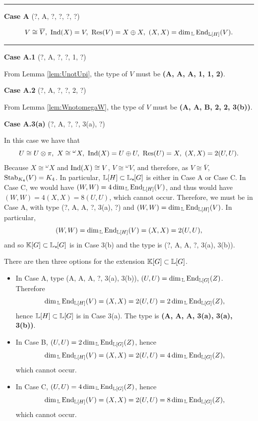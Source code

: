 \vspace{0.5em}
\textcolor{gray}{\hrule}

\vspace{0.9em}
\begin{center}
    \large{\textbf{Case A} (?, A, ?, ?, ?, ?)}
\end{center}
\[
 V \cong \overline{V}, \ \Ind(X) = V, \ \Res(V) = X \oplus X, \ (X,X) = \dim_{\bbL} \End_{\bL[H]}(V).
\]
\vspace{-0.3em}
\textcolor{gray}{\hrule}
\vspace{0.5em}

\vspace{0.5em}
\noindent \textbf{Case A.1} (?, A, ?, ?, 1, ?)

From Lemma \ref{lem:UnotUpi}, the type of $V$ must be \textbf{(A, A, A, 1, 1, 2)}.

\vspace{0.5em}
\noindent \textbf{Case A.2} (?, A, ?, ?, 2, ?)

From Lemma \ref{lem:WnotomegaW}, the type of $V$ must be \textbf{(A, A, B, 2, 2, 3(b))}.

\vspace{0.5em}
\noindent \textbf{Case A.3(a)} (?, A, ?, ?, 3(a), ?)

In this case we have that
\[
U \cong U \otimes \pi, \ X \cong {}^{\omega} X,\ \Ind(X) = U \oplus U, \ \Res(U) = X, \ (X,X) = 2(U,U).
\]
Because $X \cong {}^{\omega} X$ and $\operatorname{Ind}(X) \cong V$, $V \cong {}^{\omega} V$, and therefore, as $V \cong \overline{V}$, $\operatorname{Stab}_{K_4}(V) = K_4$. In particular, ${\mathbb L}[H] \subset {\mathbb L}_{\star \hspace{-0.1em}}[G]$ is either in Case A or Case C. In Case C, we would have $(W,W) = 4 \dim_{\, {\mathbb L}} \operatorname{End}_{{\mathbb L}[H]}(V)$, and thus would have $(W,W) = 4 (X,X) = 8(U,U)$, which cannot occur. Therefore, we must be in Case A, with type (?, A, A, ?, 3(a), ?) and $(W,W) = \dim_{\, {\mathbb L}} \operatorname{End}_{{\mathbb L}[H]}(V)$. In particular,
\[
(W,W) = \dim_{\, {\mathbb L}} \operatorname{End}_{{\mathbb L}[H]}(V) = (X,X) = 2(U,U),
\]
and so ${\mathbb K}[G] \subset {\mathbb L}_{\star \hspace{-0.1em}}[G]$ is in Case 3(b) and the type is (?, A, A, ?, 3(a), 3(b)).

There are then three options for the extension ${\mathbb K}[G] \subset {\mathbb L}[G]$.
\begin{itemize}
\item In Case A, type (A, A, A, ?, 3(a), 3(b)), $(U,U) = \dim_{\, {\mathbb L}}\operatorname{End}_{{\mathbb L}[G]}(Z)$. Therefore
    \[
    \dim_{\, {\mathbb L}}\operatorname{End}_{{\mathbb L}[H]}(V) = (X,X) = 2(U,U) = 2 \dim_{\, {\mathbb L}}\operatorname{End}_{{\mathbb L}[G]}(Z),
    \]
    hence ${\mathbb L}[H] \subset {\mathbb L}[G]$ is in Case 3(a). The type is \textbf{(A, A, A, 3(a), 3(a), 3(b))}.
\item In Case B, $(U,U) = 2\dim_{\, {\mathbb L}}\operatorname{End}_{{\mathbb L}[G]}(Z)$, hence
\[
\dim_{\, {\mathbb L}}\operatorname{End}_{{\mathbb L}[H]}(V) = (X,X) = 2(U,U) = 4 \dim_{\, {\mathbb L}}\operatorname{End}_{{\mathbb L}[G]}(Z),
\]
which cannot occur.
\item In Case C, $(U,U) = 4\dim_{\, {\mathbb L}}\operatorname{End}_{{\mathbb L}[G]}(Z)$, hence
\[
\dim_{\, {\mathbb L}}\operatorname{End}_{{\mathbb L}[H]}(V) = (X,X) = 2(U,U) = 8 \dim_{\, {\mathbb L}}\operatorname{End}_{{\mathbb L}[G]}(Z),
\]
which cannot occur.
\end{itemize}

